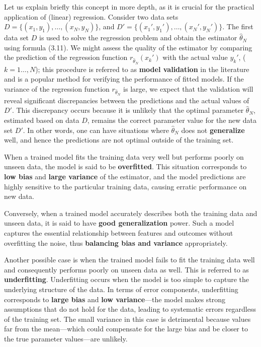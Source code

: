 \documentclass{report}
\begin{document}
Let us explain briefly this concept in more depth, as it is crucial for the practical application of (linear) regression. Consider two data sets $D = \{(x_1,y_1),\dots,(x_N,y_N)\}$, and $D' = \{(x_1',y_1'),\dots,(x_N',y_N')\}$. The first data set $D$ is used to solve the regression problem and obtain the estimator $\hat{\theta}_N$ using formula (3.11). We might assess the quality of the estimator by comparing the prediction of the regression function $r_{\hat{\theta}_N}(x_k')$ with the actual value $y_k'$, ($k = 1\dots,N$); this procedure is referred to as \textbf{model validation} in the literature and is a popular method for verifying the performance of fitted models. If the variance of the regression function $r_{\hat{\theta}_N}$ is large, we expect that the validation will reveal significant discrepancies between the predictions and the actual values of $D'$. This discrepancy occurs because it is unlikely that the optimal parameter $\hat{\theta}_N$, estimated based on data $D$, remains the correct parameter value for the new data set $D'$. In other words, one can have situations where 
$\hat{\theta}_N$ does not \textbf{generalize} well, and hence the predictions are not optimal outside of the training set.

When a trained model fits the training data very well but performs poorly on unseen data, the model is said to be \textbf{overfitted}. This situation corresponds to \textbf{low bias} and \textbf{large variance} of the estimator, and the model predictions are highly sensitive to the particular training data, causing erratic performance on new data.

Conversely, when a trained model accurately describes both the training data and unseen data, it is said to have \textbf{good generalization} power. Such a model captures the essential relationship between features and outcomes without overfitting the noise, thus \textbf{balancing bias and variance} appropriately.

Another possible case is when the trained model fails to fit the training data well and consequently performs poorly on unseen data as well. This is referred to as \textbf{underfitting}. Underfitting occurs when the model is too simple to capture the underlying structure of the data. In terms of error components, underfitting corresponds to \textbf{large bias} and \textbf{low variance}—the model makes strong assumptions that do not hold for the data, leading to systematic errors regardless of the training set. The small variance in this case is detrimental because values far from the mean—which could compensate for the large bias and be closer to the true parameter values—are unlikely.
\end{document}
